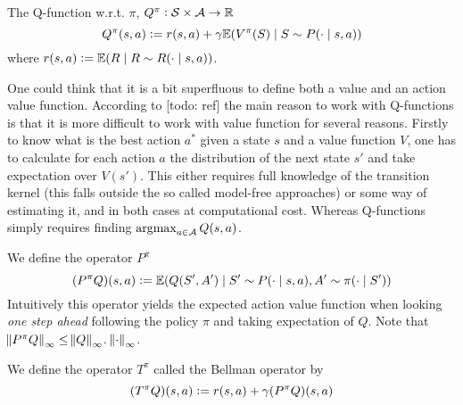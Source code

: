 The  Q-function 
w.r.t. $\pi$,
$Q^\pi : \mathcal{S} \times \mathcal{A} \to \mathbb{R}$
\[ Q^\pi(s, a) \vcentcolon= r(s, a) +
\gamma \mathbb{E} (V^\pi(S) \mid S \sim P(\cdot \mid s, a)) \]
where $r(s,a) \vcentcolon= \mathbb{E}(R \mid R \sim R(\cdot \mid s, a))$.

One could think that it is a bit superfluous to define both a value and an
action value function. 
According to [todo: ref] the main reason to work with Q-functions
is that it is more difficult to work with value function for several reasons.
Firstly to know what is the best action $a^*$ given a state $s$
and a value function $V$, one has to calculate for each action $a$
the distribution of the next state $s'$ and take expectation over
$V(s')$. This either requires full knowledge of the transition kernel
(this falls outside the so called model-free approaches)
or some way of estimating it, and in both cases at computational cost.
Whereas Q-functions simply requires finding
$\operatorname*{argmax}_{a \in \mathcal{A}} Q(s,a)$.

We define the operator $P^\pi$
\[ (P^\pi Q)(s, a) \vcentcolon= \mathbb{E} (Q(S', A') \mid S' \sim P(\cdot \mid s, a),
A' \sim \pi(\cdot \mid S')) \]
Intuitively this operator yields the expected action value function
when looking \emph{one step ahead} following the policy $\pi$ and taking
expectation of $Q$.
Note that $\norm{P^\pi Q}_\infty \leq \norm{Q}_\infty$.
$\norm{\cdot}_\infty$.

We define the operator $T^\pi$ called the Bellman operator by
\[ (T^\pi Q)(s, a) \vcentcolon= r(s, a) + \gamma (P^\pi Q)(s, a) \]

